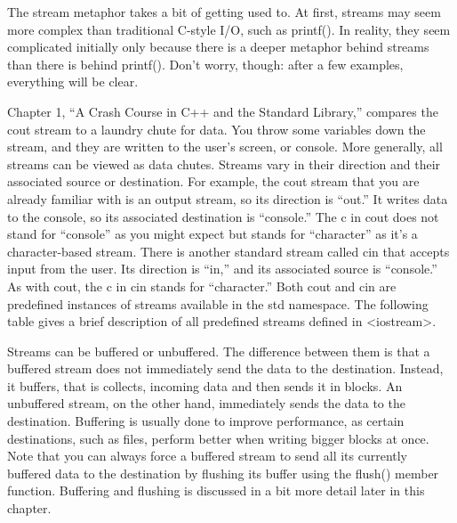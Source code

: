 
The stream metaphor takes a bit of getting used to. At first, streams may seem more complex than traditional C-style I/O, such as printf(). In reality, they seem complicated initially only because there is a deeper metaphor behind streams than there is behind printf(). Don’t worry, though: after a few examples, everything will be clear.


Chapter 1, “A Crash Course in C++ and the Standard Library,” compares the cout stream to a laundry chute for data. You throw some variables down the stream, and they are written to the user’s screen, or console. More generally, all streams can be viewed as data chutes. Streams vary in their direction and their associated source or destination. For example, the cout stream that you are already familiar with is an output stream, so its direction is “out.” It writes data to the console, so its associated destination is “console.” The c in cout does not stand for “console” as you might expect but stands for “character” as it’s a character-based stream. There is another standard stream called cin that accepts input from the user. Its direction is “in,” and its associated source is “console.” As with cout, the c in cin stands for “character.” Both cout and cin are predefined instances of streams available in the std namespace. The following table gives a brief description of all predefined streams defined in <iostream>.

Streams can be buffered or unbuffered. The difference between them is that a buffered stream does not immediately send the data to the destination. Instead, it buffers, that is collects, incoming data and then sends it in blocks. An unbuffered stream, on the other hand, immediately sends the data to the destination. Buffering is usually done to improve performance, as certain destinations, such as files, perform better when writing bigger blocks at once. Note that you can always force a buffered stream to send all its currently buffered data to the destination by flushing its buffer using the flush() member function. Buffering and flushing is discussed in a bit more detail later in this chapter.

